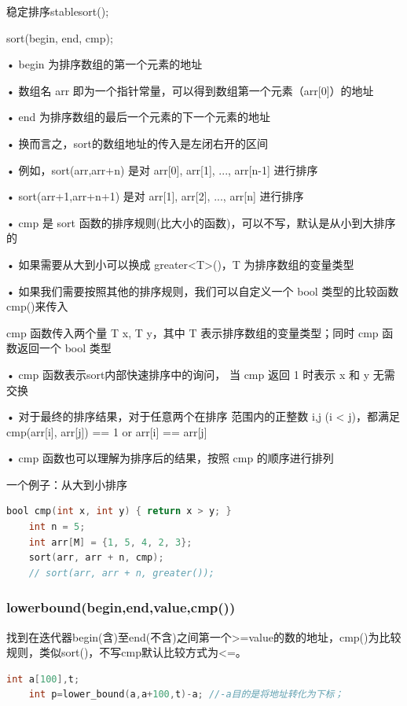 \documentclass[UTF8]{ctexart}
\begin{document}
稳定排序stable\textunderscore sort();

sort(begin, end, cmp);

• begin 为排序数组的第一个元素的地址

• 数组名 arr 即为一个指针常量，可以得到数组第一个元素（arr[0]）的地址

• end 为排序数组的最后一个元素的下一个元素的地址

• 换而言之，sort的数组地址的传入是左闭右开的区间

• 例如，sort(arr,arr+n) 是对 arr[0], arr[1], ..., arr[n-1] 进行排序 

• sort(arr+1,arr+n+1) 是对 arr[1], arr[2], ..., arr[n] 进行排序 

• cmp 是 sort 函数的排序规则(比大小的函数)，可以不写，默认是从小到大排序的 

• 如果需要从大到小可以换成 greater<T>()，T 为排序数组的变量类型 

• 如果我们需要按照其他的排序规则，我们可以自定义一个 bool 类型的比较函数cmp()来传入

cmp 函数传入两个量 T x, T y，其中 T 表示排序数组的变量类型；同时 cmp 函数返回一个 bool 类型 

• cmp 函数表示sort内部快速排序中的询问， 当 cmp 返回 1 时表示 x 和 y 无需交换 

• 对于最终的排序结果，对于任意两个在排序 范围内的正整数 i,j (i < j)，都满足 cmp(arr[i], arr[j]) == 1 or arr[i] == arr[j] 

• cmp 函数也可以理解为排序后的结果，按照 cmp 的顺序进行排列

一个例子：从大到小排序 
\begin{lstlisting}[language = C,basicstyle=\small\ttfamily]
    bool cmp(int x, int y) { return x > y; }
    int n = 5; 
    int arr[M] = {1, 5, 4, 2, 3}; 
    sort(arr, arr + n, cmp); 
    // sort(arr, arr + n, greater());
\end{lstlisting}

\subsubsection{lower\textunderscore bound(begin,end,value,cmp())}
找到在迭代器begin(含)至end(不含)之间第一个>=value的数的地址，cmp()为比较规则，类似sort()，不写cmp默认比较方式为<=。
\begin{lstlisting}[language = C,basicstyle=\small\ttfamily]
    int a[100],t;
    int p=lower_bound(a,a+100,t)-a; //-a目的是将地址转化为下标；
\end{lstlisting}
\end{document}
